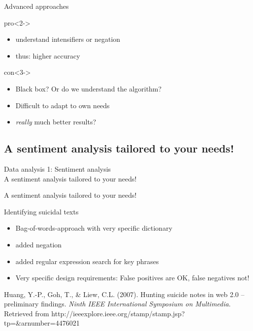 \documentclass{beamer}
\begin{document}
\begin{frame}{Advanced approaches}
\begin{block}{pro}<2->
\begin{itemize}
\item understand intensifiers or negation
\item thus: higher accuracy
\end{itemize}
\end{block}
\begin{block}{con}<3->
\begin{itemize}
\item Black box? Or do we understand the algorithm?
\item Difficult to adapt to own needs
\item \emph{really} much better results?
\end{itemize}
\end{block}
\end{frame}



\subsection{A sentiment analysis tailored to your needs!}
\begin{frame}
Data analysis 1: Sentiment analysis\\
A sentiment analysis tailored to your needs!
\end{frame}




\begin{frame}{A sentiment analysis tailored to your needs!}
\begin{block}{Identifying suicidal texts}
\begin{itemize}
\item Bag-of-words-approach with very specific dictionary
\item added negation
\item added regular expression search for key phrases
\item Very specific design requirements: False positives are OK, false negatives not!
\end{itemize}
\end{block}
\par
\tiny{Huang, Y.-P., Goh, T., \& Liew, C.L. (2007). Hunting suicide notes in web 2.0 – preliminary findings. \emph{Ninth IEEE International Symposium on Multimedia}. Retrieved from http://ieeexplore.ieee.org/stamp/stamp.jsp?tp=\&arnumber=4476021}\\
\end{frame}
\end{document}
